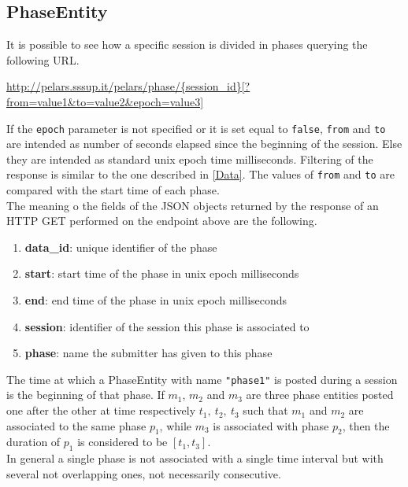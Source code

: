 \documentclass[a4paper,notitlepage,onecolumn]{hitec}  %
\begin{document}
\subsection{PhaseEntity}\label{PhaseEntity}
It is possible to see how a specific session is divided in phases querying the following URL.
\begin{center}
 \url{http://pelars.sssup.it/pelars/phase/{session\_id}[?from=value1&to=value2&epoch=value3]}
\end{center}
If the {\tt epoch} parameter is not specified or it is set equal to {\tt false}, {\tt from} and {\tt to} are intended as number of seconds elapsed since the beginning of the session. Else they are intended as standard unix epoch time milliseconds. 
Filtering of the response is similar to the one described in \ref{Data}. The values of {\tt from} and {\tt to} are compared with the start time of each phase.\\
The meaning o the fields of the JSON objects returned by the response of an HTTP GET performed on the endpoint above are the following. 
\begin{enumerate}
\item\textbf{data\_id}: unique identifier of the phase
\item\textbf{start}: start time of the phase in unix epoch milliseconds
\item \textbf{end}: end time of the phase in unix epoch milliseconds
\item\textbf{session}: identifier of the session this phase is associated to
\item \textbf{phase}: name the submitter has given to this phase
\end{enumerate}
The time at which a PhaseEntity with name {\tt "phase1"} is posted during a session is the beginning of that phase. 
If $m_1$, $m_2$ and $m_3$ are three phase entities posted one after the other at time respectively $t_1,\ t_2,\ t_3$ such that $m_1$ and $m_2$ are associated to the same phase $p_1$, while $m_3$ is associated with phase $p_2$, then the duration of $p_1$ is considered to be $[t_1,t_3]$.\\ In general a single phase is not associated with a single time interval but with several not overlapping ones, not necessarily consecutive. 
\end{document}
